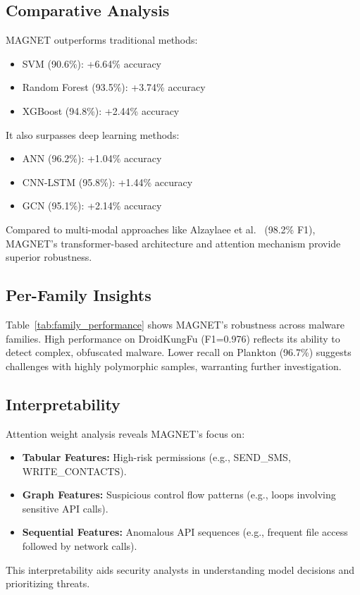 \documentclass[10pt,conference]{IEEEtran}
\begin{document}
\subsection{Comparative Analysis}
MAGNET outperforms traditional methods:
\begin{itemize}
    \item SVM (90.6\%): +6.64\% accuracy
    \item Random Forest (93.5\%): +3.74\% accuracy
    \item XGBoost (94.8\%): +2.44\% accuracy
\end{itemize}
It also surpasses deep learning methods:
\begin{itemize}
    \item ANN (96.2\%): +1.04\% accuracy
    \item CNN-LSTM (95.8\%): +1.44\% accuracy
    \item GCN (95.1\%): +2.14\% accuracy
\end{itemize}
Compared to multi-modal approaches like Alzaylaee et al.~\cite{DroidMultiModal} (98.2\% F1), MAGNET’s transformer-based architecture and attention mechanism provide superior robustness.

\subsection{Per-Family Insights}
Table~\ref{tab:family_performance} shows MAGNET’s robustness across malware families. High performance on DroidKungFu (F1=0.976) reflects its ability to detect complex, obfuscated malware. Lower recall on Plankton (96.7\%) suggests challenges with highly polymorphic samples, warranting further investigation.

\subsection{Interpretability}
Attention weight analysis reveals MAGNET’s focus on:
\begin{itemize}
    \item \textbf{Tabular Features:} High-risk permissions (e.g., SEND\_SMS, WRITE\_CONTACTS).
    \item \textbf{Graph Features:} Suspicious control flow patterns (e.g., loops involving sensitive API calls).
    \item \textbf{Sequential Features:} Anomalous API sequences (e.g., frequent file access followed by network calls).
\end{itemize}
This interpretability aids security analysts in understanding model decisions and prioritizing threats.
\end{document}
